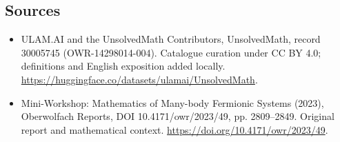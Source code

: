 \documentclass[11pt]{article}
\begin{document}
\subsection{Sources}
\begin{itemize}
\item[\hypertarget{source:30005745:1}{S1}] ULAM.AI and the UnsolvedMath Contributors, UnsolvedMath, record 30005745 (OWR-14298014-004). Catalogue curation under CC BY 4.0; definitions and English exposition added locally.
\url{https://huggingface.co/datasets/ulamai/UnsolvedMath}.
\item[\hypertarget{source:30005745:2}{S2}] Mini-Workshop: Mathematics of Many-body Fermionic Systems (2023), Oberwolfach Reports, DOI 10.4171/owr/2023/49, pp. 2809--2849. Original report and mathematical context.
\url{https://doi.org/10.4171/owr/2023/49}.
\end{itemize}
\label{end:30005745}
\end{document}
